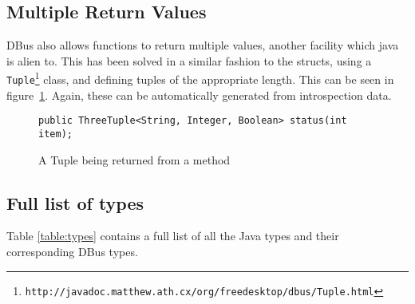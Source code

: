\documentclass[a4paper,12pt]{article}
\begin{document}
\subsection{Multiple Return Values}

DBus also allows functions to return multiple values, another
facility which java is alien to. This has been solved in a similar
fashion to the structs, using a {\tt
Tuple\footnote{http://javadoc.matthew.ath.cx/org/freedesktop/dbus/Tuple.html}} class, and
defining tuples of the appropriate length. This can be seen in
figure~\ref{fig:tuple}. Again, these can be automatically generated
from introspection data.

\begin{figure}[htb]
\begin{center}
\begin{verbatim}
public ThreeTuple<String, Integer, Boolean> status(int item);
\end{verbatim}
\end{center}
\caption{A Tuple being returned from a method}
\label{fig:tuple}
\end{figure}

\subsection{Full list of types}

Table \ref{table:types} contains a full list of all the Java types and their corresponding DBus types.
\end{document}
